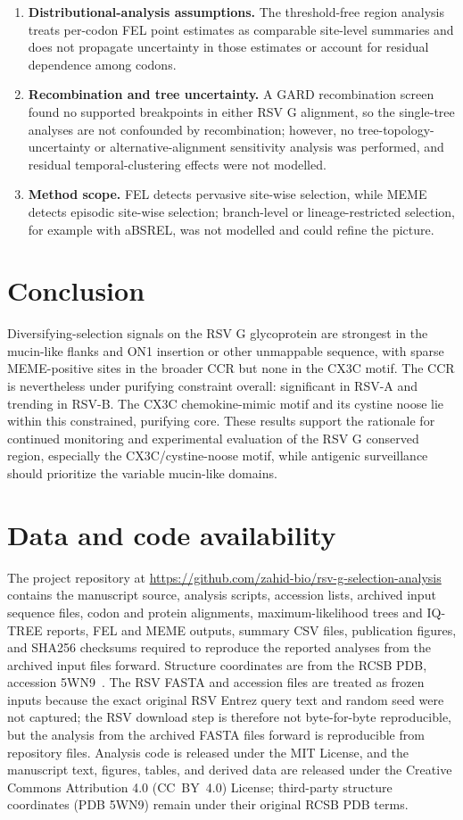 \documentclass[11pt]{article}
\begin{document}
\begin{enumerate}
\item \textbf{Distributional-analysis assumptions.} The threshold-free region analysis treats per-codon FEL point estimates as comparable site-level summaries and does not propagate uncertainty in those estimates or account for residual dependence among codons.
\item \textbf{Recombination and tree uncertainty.} A GARD recombination screen found no supported breakpoints in either RSV G alignment, so the single-tree analyses are not confounded by recombination; however, no tree-topology-uncertainty or alternative-alignment sensitivity analysis was performed, and residual temporal-clustering effects were not modelled.
\item \textbf{Method scope.} FEL detects pervasive site-wise selection, while MEME detects episodic site-wise selection; branch-level or lineage-restricted selection, for example with aBSREL, was not modelled and could refine the picture.
\end{enumerate}

\section{Conclusion}

Diversifying-selection signals on the RSV G glycoprotein are strongest in the mucin-like flanks and ON1 insertion or other unmappable sequence, with sparse MEME-positive sites in the broader CCR but none in the CX3C motif. The CCR is nevertheless under purifying constraint overall: significant in RSV-A and trending in RSV-B. The CX3C chemokine-mimic motif and its cystine noose lie within this constrained, purifying core. These results support the rationale for continued monitoring and experimental evaluation of the RSV G conserved region, especially the CX3C/cystine-noose motif, while antigenic surveillance should prioritize the variable mucin-like domains.

\section*{Data and code availability}

The project repository at \url{https://github.com/zahid-bio/rsv-g-selection-analysis} contains the manuscript source, analysis scripts, accession lists, archived input sequence files, codon and protein alignments, maximum-likelihood trees and IQ-TREE reports, FEL and MEME outputs, summary CSV files, publication figures, and SHA256 checksums required to reproduce the reported analyses from the archived input files forward. Structure coordinates are from the RCSB PDB, accession 5WN9~\cite{pdb5wn9}. The RSV FASTA and accession files are treated as frozen inputs because the exact original RSV Entrez query text and random seed were not captured; the RSV download step is therefore not byte-for-byte reproducible, but the analysis from the archived FASTA files forward is reproducible from repository files. Analysis code is released under the MIT License, and the manuscript text, figures, tables, and derived data are released under the Creative Commons Attribution 4.0 (CC~BY~4.0) License; third-party structure coordinates (PDB 5WN9) remain under their original RCSB PDB terms.
\end{document}
